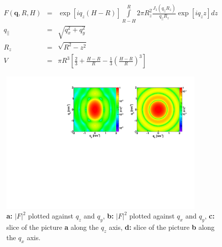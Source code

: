\begin{eqnarray}
F(\mathbf q, R, H) &=& \exp\left[iq_z\left(H-R\right)\right]\int\limits_{R-H}^{R}{2\pi R_z^2\frac{J_1(q_{||}R_z)}{q_{||}R_z}\exp\left[iq_zz\right]dz} \\
q_{||} &=& \sqrt{q_x^2+q_y^2} \\
R_z &=& \sqrt{R^2-z^2} \\
V &=& \pi R^3 \left[\frac{2}{3} + \frac{H-R}{R} - \frac{1}{3}\left(\frac{H-R}{R}\right)^3\right] 
\label{eq:ffsphere}
\end{eqnarray}


\begin{figure}[h]
\begin{center}
\includegraphics[width=0.9\textwidth]{Figures/figffsphere}
\end{center}
\caption{{\bf a:} $|F|^2$ plotted against $q_z$ and $q_y$, {\bf b:} $|F|^2$ plotted against $q_x$ and $q_y$, {\bf c:} slice of the picture {\bf a} along the $q_z$ axis, {\bf d:} slice of the picture {\bf b} along the $q_x$ axis.}
\end{figure}

\par



\newpage{\cleardoublepage}


